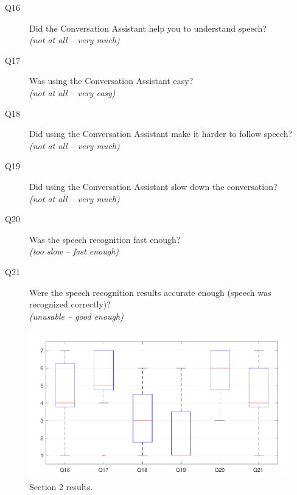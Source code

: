 \documentclass[english, 12pt, a4paper, pdftex, elec, utf8]{aaltothesis}
\begin{document}
\begin{description}
    \item[Q16] Did the Conversation Assistant help you to understand speech? \\ \textit{(not at all -- very much)}
    \item[Q17] Was using the Conversation Assistant easy? \\ \textit{(not at all -- very easy)}
    \item[Q18] Did using the Conversation Assistant make it harder to follow speech? \\ \textit{(not at all -- very much)}
    \item[Q19] Did using the Conversation Assistant slow down the conversation? \\ \textit{(not at all  -- very much)}
    \item[Q20] Was the speech recognition fast enough? \\ \textit{(too slow -- fast enough)}
    \item[Q21] Were the speech recognition results accurate enough (speech was recognized correctly)? \\ \textit{(unusable -- good enough)}
\end{description}
\begin{figure}[h!]
    \centering
    \includegraphics[width=\textwidth]{T2_box3.pdf}
    \caption{Section 2 results.}
    \label{fig:results3} 
\end{figure}
\end{document}
